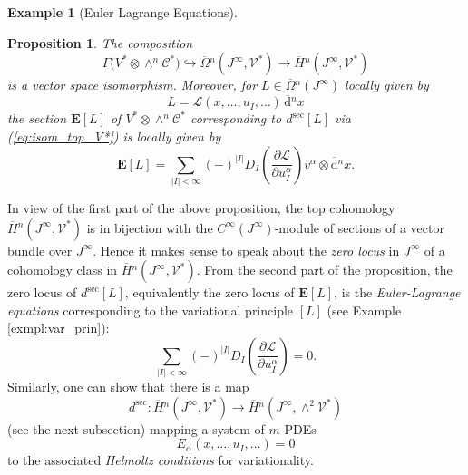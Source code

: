 \documentclass{conm-p-l}
\newtheorem{proposition}[theorem]{Proposition}
\theoremstyle{definition}
\newtheorem{example}[theorem]{Example}
\theoremstyle{remark}
\numberwithin{equation}{section}
\begin{document}
\begin{example}[Euler Lagrange Equations]
\begin{proposition}
The composition
\begin{equation}\label{eq:isom_top_V*}
\Gamma \big(V^\ast \otimes \wedge^n \mathscr C^\ast \big) \hookrightarrow \overline \Omega{}^n (J^\infty, \mathscr V^\ast) \longrightarrow \overline H{}^n (J^\infty, \mathscr V^\ast)
\end{equation}
is a vector space isomorphism. Moreover, for $L \in \overline \Omega{}^n (J^\infty)$ locally given by 
\[
L = \mathscr L (x, \ldots, u_I, \ldots)\, \overline{\mathrm d}{}^n x
\]
the section $\mathbf E [L]$ of $V^\ast \otimes \wedge^n \mathscr C^\ast$ corresponding to $d^{\mathrm{sec}} [L]$ via (\ref{eq:isom_top_V*}) is locally given by
\[
\mathbf E [L] = \sum_{|I| < \infty} (-)^{|I|} D_I \left( \frac{\partial \mathscr L}{\partial u^\alpha_I}\right) v^\alpha \otimes \overline{\mathrm d}{}^n x.
\]
\end{proposition}

In view of the first part of the above proposition, the top cohomology $\overline H{}^n (J^\infty, \mathscr V^\ast)$ is in bijection with the $C^\infty (J^\infty)$-module of sections of a vector bundle over $J^\infty$. Hence it makes sense to speak about the \emph{zero locus} in $J^\infty$ of a cohomology class in $\overline H{}^n (J^\infty, \mathscr V^\ast)$. From the second part of the proposition, the zero locus of $d^{\mathrm{sec}} [L]$, equivalently the zero locus of $\mathbf E [L]$, is the \emph{Euler-Lagrange equations} corresponding to the variational principle $[L]$ (see Example \ref{exmpl:var_prin}):
\[
\sum_{|I| < \infty} (-)^{|I|} D_I \left( \frac{\partial \mathscr L}{\partial u^\alpha_I}\right)  = 0. 
\]
Similarly, one can show that there is a map
\[
d^{\mathrm{sec}} : \overline H{}^n (J^\infty, \mathscr V^\ast) \to \overline H{}^n (J^\infty, \wedge^2 \mathscr V^\ast)
\]
(see the next subsection) mapping a system of $m$ PDEs
\[
 E_\alpha (x, \ldots, u_I, \ldots) = 0 
\]
to the associated \emph{Helmoltz conditions} for variationality.
\end{example}
\end{document}
